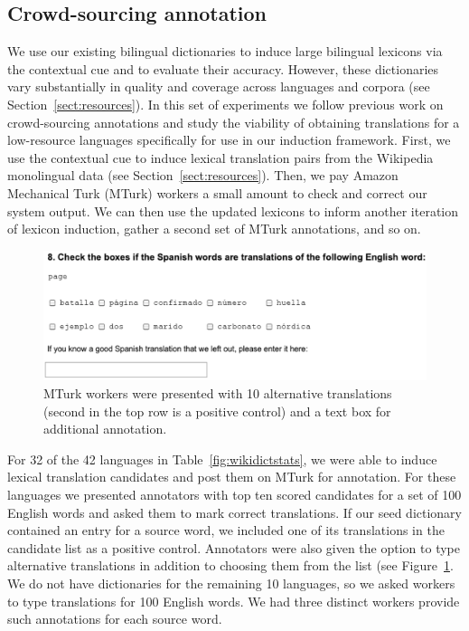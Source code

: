 \documentclass{article}
\newcommand{\secref}[1]{Section~\ref{#1}}
\newcommand{\tabref}[1]{Table~\ref{#1}}
\newcommand{\figref}[1]{Figure~\ref{#1}}
\begin{document}
\subsection{Crowd-sourcing annotation} \label{sect:mturk}

We use our existing bilingual dictionaries to induce large bilingual lexicons via the contextual cue and to evaluate their accuracy.  However, these dictionaries vary substantially in quality and coverage across languages and corpora (see \secref{sect:resources}).  In this set of experiments we follow previous work on crowd-sourcing annotations \cite{Snow:2008,CCB:2009} and study \cite{Irvine:2010} the viability of obtaining translations for a low-resource languages specifically for use in our induction framework.  First, we use the contextual cue to induce lexical translation pairs from the Wikipedia monolingual data (see \secref{sect:resources}). Then, we pay Amazon Mechanical Turk (MTurk) workers a small amount to check and correct our system output. We can then use the updated lexicons to inform another iteration of lexicon induction, gather a second set of MTurk annotations, and so on. \\

\begin{figure}[t!]
\centerline{\includegraphics[width=4.8in]{figures/MTurkHIT}}
\caption{MTurk workers were presented with 10 alternative translations (second in the top row is a positive control) and a text box for additional annotation.}
\label{fig:hit}
\end{figure}

For 32 of the 42 languages in \tabref{fig:wikidictstats}, we were able to induce lexical translation candidates and post them on MTurk for annotation. For these languages we presented annotators with top ten scored candidates for a set of 100 English words and asked them to mark correct translations. If our seed dictionary contained an entry for a source word, we included one of its translations in the candidate list as a positive control. %
Annotators were also given the option to type alternative translations in addition to choosing them from the list (see \figref{fig:hit}.
We do not have dictionaries for the remaining 10 languages, so we asked workers to type translations for 100 English words. We had three distinct workers provide such annotations for each source word. \\ 
\end{document}

